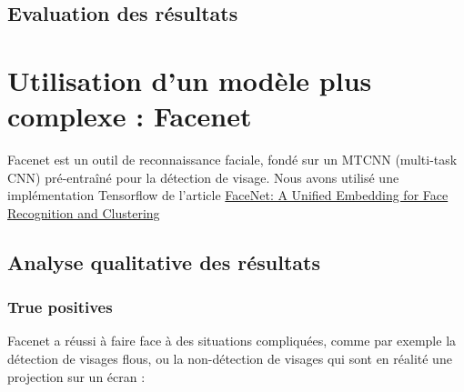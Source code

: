 \documentclass[a4paper,11pt]{article}
\begin{document}
    \subsection{Evaluation des résultats}

\section{Utilisation d'un modèle plus complexe : Facenet}

    Facenet est un outil de reconnaissance faciale, fondé sur un MTCNN (multi-task CNN) pré-entraîné pour la détection de visage. Nous avons utilisé une implémentation Tensorflow de l'article \href{https://arxiv.org/abs/1503.03832}{FaceNet: A Unified Embedding for Face Recognition and Clustering}

    \subsection{Analyse qualitative des résultats}
	\subsubsection{True positives}

	    Facenet a réussi à faire face à des situations compliquées, comme par exemple la détection de visages flous, ou la non-détection de visages qui sont en réalité une projection sur un écran :\\
	    
\end{document}
